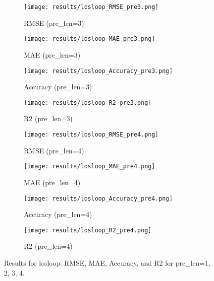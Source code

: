 \documentclass{article}
\begin{document}
\begin{figure}[htbp]
    \begin{subfigure}[b]{0.24\textwidth}
        \texttt{[image: results/losloop\_RMSE\_pre3.png]}
        \caption{RMSE (pre\_len=3)}
    \end{subfigure}
    \begin{subfigure}[b]{0.24\textwidth}
        \texttt{[image: results/losloop\_MAE\_pre3.png]}
        \caption{MAE (pre\_len=3)}
    \end{subfigure}
    \begin{subfigure}[b]{0.24\textwidth}
        \texttt{[image: results/losloop\_Accuracy\_pre3.png]}
        \caption{Accuracy (pre\_len=3)}
    \end{subfigure}
    \begin{subfigure}[b]{0.24\textwidth}
        \texttt{[image: results/losloop\_R2\_pre3.png]}
        \caption{R2 (pre\_len=3)}
    \end{subfigure}

    \begin{subfigure}[b]{0.24\textwidth}
        \texttt{[image: results/losloop\_RMSE\_pre4.png]}
        \caption{RMSE (pre\_len=4)}
    \end{subfigure}
    \begin{subfigure}[b]{0.24\textwidth}
        \texttt{[image: results/losloop\_MAE\_pre4.png]}
        \caption{MAE (pre\_len=4)}
    \end{subfigure}
    \begin{subfigure}[b]{0.24\textwidth}
        \texttt{[image: results/losloop\_Accuracy\_pre4.png]}
        \caption{Accuracy (pre\_len=4)}
    \end{subfigure}
    \begin{subfigure}[b]{0.24\textwidth}
        \texttt{[image: results/losloop\_R2\_pre4.png]}
        \caption{R2 (pre\_len=4)}
    \end{subfigure}

    \caption{Results for losloop: RMSE, MAE, Accuracy, and R2 for pre\_len=1, 2, 3, 4.}
\end{figure}
\end{document}
